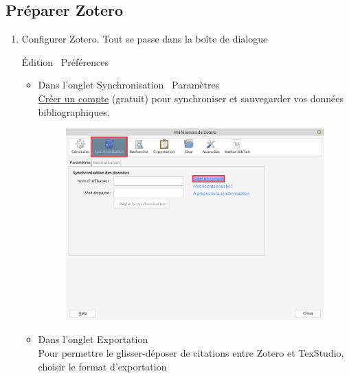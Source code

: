 \subsection{Préparer Zotero}
\label{sec:preparerZotero}

\begin{enumerate}
	\item Configurer Zotero. Tout se passe dans la boîte de dialogue 
			\begin{center}
				Édition \textrightarrow \ Préférences
			\end{center}
		\begin{itemize}
			\item Dans l'onglet Synchronisation \textrightarrow \ Paramètres \\
				\href{https://www.zotero.org/user/register}{Créer un compte} (gratuit) pour synchroniser et sauvegarder vos données bibliographiques.
			\begin{center}
				\begin{figure}[H]
					\centering
					\includegraphics[width=12cm]{captures/zotero_01_compte}
					\caption{}
					\label{fig:zotero_01_compte}
				\end{figure}
			\end{center}
			\item Dans l'onglet Exportation \\
				Pour permettre le glisser-déposer de citations entre Zotero et TexStudio, choisir le format d'exportation 
				\begin{center}
					\begin{figure}[H]
						\centering

\end{figure}
\end{center}
\end{itemize}
\end{enumerate}

